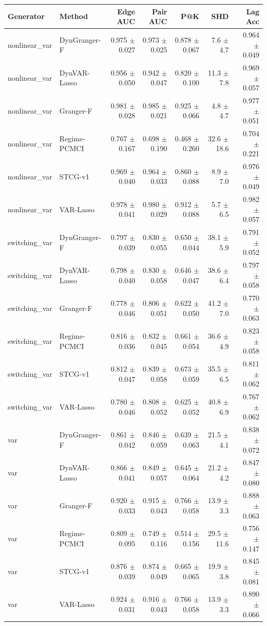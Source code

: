 \begin{tabular}{llrrrrr}
\toprule
Generator & Method & Edge AUC & Pair AUC & P@K & SHD & Lag Acc \\
\midrule
nonlinear_var & DynGranger-F & 0.975 $\pm$ 0.027 & 0.973 $\pm$ 0.025 & 0.878 $\pm$ 0.067 & 7.6 $\pm$ 4.7 & 0.964 $\pm$ 0.049 \\
nonlinear_var & DynVAR-Lasso & 0.956 $\pm$ 0.050 & 0.942 $\pm$ 0.047 & 0.820 $\pm$ 0.100 & 11.3 $\pm$ 7.8 & 0.969 $\pm$ 0.057 \\
nonlinear_var & Granger-F & 0.981 $\pm$ 0.028 & 0.985 $\pm$ 0.021 & 0.925 $\pm$ 0.066 & 4.8 $\pm$ 4.7 & 0.977 $\pm$ 0.051 \\
nonlinear_var & Regime-PCMCI & 0.767 $\pm$ 0.167 & 0.698 $\pm$ 0.190 & 0.468 $\pm$ 0.260 & 32.6 $\pm$ 18.6 & 0.704 $\pm$ 0.221 \\
nonlinear_var & STCG-v1 & 0.969 $\pm$ 0.040 & 0.964 $\pm$ 0.033 & 0.860 $\pm$ 0.088 & 8.9 $\pm$ 7.0 & 0.976 $\pm$ 0.049 \\
nonlinear_var & VAR-Lasso & 0.978 $\pm$ 0.041 & 0.980 $\pm$ 0.029 & 0.912 $\pm$ 0.088 & 5.7 $\pm$ 6.5 & 0.982 $\pm$ 0.057 \\
switching_var & DynGranger-F & 0.797 $\pm$ 0.039 & 0.830 $\pm$ 0.055 & 0.650 $\pm$ 0.044 & 38.1 $\pm$ 5.9 & 0.791 $\pm$ 0.052 \\
switching_var & DynVAR-Lasso & 0.798 $\pm$ 0.040 & 0.830 $\pm$ 0.058 & 0.646 $\pm$ 0.047 & 38.6 $\pm$ 6.4 & 0.797 $\pm$ 0.058 \\
switching_var & Granger-F & 0.778 $\pm$ 0.046 & 0.806 $\pm$ 0.051 & 0.622 $\pm$ 0.050 & 41.2 $\pm$ 7.0 & 0.770 $\pm$ 0.063 \\
switching_var & Regime-PCMCI & 0.816 $\pm$ 0.036 & 0.832 $\pm$ 0.045 & 0.661 $\pm$ 0.054 & 36.6 $\pm$ 4.9 & 0.823 $\pm$ 0.058 \\
switching_var & STCG-v1 & 0.812 $\pm$ 0.047 & 0.839 $\pm$ 0.058 & 0.673 $\pm$ 0.059 & 35.5 $\pm$ 6.5 & 0.811 $\pm$ 0.062 \\
switching_var & VAR-Lasso & 0.780 $\pm$ 0.046 & 0.808 $\pm$ 0.052 & 0.625 $\pm$ 0.052 & 40.8 $\pm$ 6.9 & 0.767 $\pm$ 0.062 \\
var & DynGranger-F & 0.861 $\pm$ 0.042 & 0.846 $\pm$ 0.059 & 0.639 $\pm$ 0.063 & 21.5 $\pm$ 4.1 & 0.838 $\pm$ 0.072 \\
var & DynVAR-Lasso & 0.866 $\pm$ 0.041 & 0.849 $\pm$ 0.057 & 0.645 $\pm$ 0.064 & 21.2 $\pm$ 4.2 & 0.847 $\pm$ 0.080 \\
var & Granger-F & 0.920 $\pm$ 0.033 & 0.915 $\pm$ 0.043 & 0.766 $\pm$ 0.058 & 13.9 $\pm$ 3.3 & 0.888 $\pm$ 0.063 \\
var & Regime-PCMCI & 0.809 $\pm$ 0.095 & 0.749 $\pm$ 0.116 & 0.514 $\pm$ 0.156 & 29.5 $\pm$ 11.6 & 0.756 $\pm$ 0.147 \\
var & STCG-v1 & 0.876 $\pm$ 0.039 & 0.874 $\pm$ 0.049 & 0.665 $\pm$ 0.065 & 19.9 $\pm$ 3.8 & 0.845 $\pm$ 0.081 \\
var & VAR-Lasso & 0.924 $\pm$ 0.031 & 0.916 $\pm$ 0.043 & 0.766 $\pm$ 0.058 & 13.9 $\pm$ 3.3 & 0.890 $\pm$ 0.066 \\
\bottomrule
\end{tabular}
